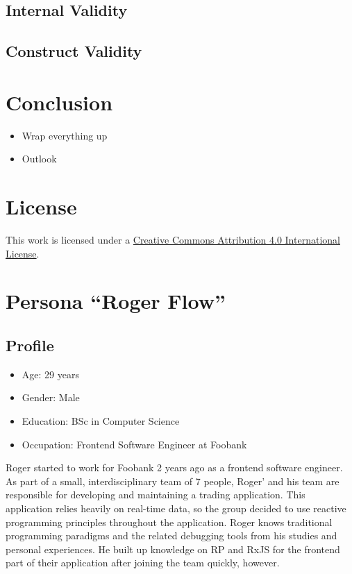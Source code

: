 \documentclass[sigplan,screen,nonacm,review]{acmart}
\begin{document}
\subsection{Internal Validity}

\subsection{Construct Validity}

\section{Conclusion}
\label{sec:conclusion}

\begin{itemize}
	\item Wrap everything up
	\item Outlook
\end{itemize}


\section*{License}
\ccby\thinspace\thinspace This work is licensed under a \href{https://creativecommons.org/licenses/by/4.0/}{Creative Commons Attribution 4.0 International License}.


\appendix
\section{Persona ``Roger Flow''}
\label{sec:persona}

\subsection{Profile}
\begin{itemize}
	\item Age: 29 years
	\item Gender: Male
	\item Education: BSc in Computer Science
	\item Occupation: Frontend Software Engineer at Foobank
\end{itemize}

Roger started to work for Foobank 2 years ago as a frontend software engineer. As part of a small, interdisciplinary team of 7 people, Roger' and his team are responsible for developing and maintaining a trading application. This application relies heavily on real-time data, so the group decided to use reactive programming principles throughout the application. Roger knows traditional programming paradigms and the related debugging tools from his studies and personal experiences. He built up knowledge on RP and RxJS for the frontend part of their application after joining the team quickly, however.
\end{document}
